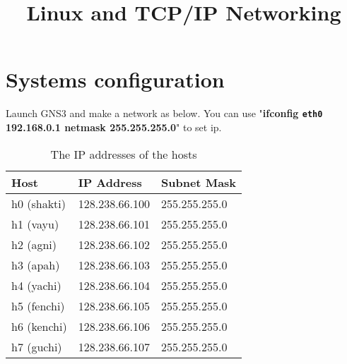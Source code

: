 \documentclass{../UTNetLab}
\title{Linux and TCP/IP Networking}
\author{%
    Dr. Ahmad Khonsari - \FR{دکتر احمد خونساری}\\
    \href{mailto:a_khonsari@ut.ac.ir}{a\_khonsari@ut.ac.ir}\\
    \vskip 1.5em%
    Amir Haji Ali Khamseh'i - \FR{امیر حاجی‌علی‌خمسه‌ء}\\
    \href{mailto:khamse@ut.ac.ir}{khamse@ut.ac.ir}\\
    \vskip 1.5em%
    \href{mailto:m.borhani@ut.ac.ir}{Muhammad Borhani} - \FR{محمد برهانی}\\
    \href{mailto:a.a.khordadi@ut.ac.ir}{Amirahmad Khordadi} - \FR{امیراحمد خردادی}\\
    \href{mailto:sina\_kashipazha@ut.ac.ir}{Sina Kashi pazha} - \FR{سینا کاشی‌پزها}
}
\begin{document}
    \maketitle

\section*{Systems configuration}
    Launch GNS3 and make a network as below. You can use "\textbf{ifconfig \texttt{eth0} 192.168.0.1 netmask 255.255.255.0}" to set ip.
    \begin{center}
        \begin{minipage}{0.48\textwidth}
            \begin{flushleft}
                \begin{table}[H]
                    \caption{The IP addresses of the hosts}
                    \vspace{5pt}
                    \centering
                    \begin{tabular}{ l l l }
                        \hline \hline
                        Host & IP Address & Subnet Mask \\
                        \hline 
                        h0 (shakti) & 128.238.66.100 & 255.255.255.0 \\
                        h1 (vayu) & 128.238.66.101 & 255.255.255.0 \\
                        h2 (agni) & 128.238.66.102 & 255.255.255.0 \\
                        h3 (apah) & 128.238.66.103 & 255.255.255.0 \\
                        h4 (yachi) & 128.238.66.104 & 255.255.255.0 \\
                        h5 (fenchi) & 128.238.66.105 & 255.255.255.0 \\
                        h6 (kenchi) & 128.238.66.106 & 255.255.255.0 \\
                        h7 (guchi) & 128.238.66.107 & 255.255.255.0 \\
                        \hline \hline
                        \end{tabular}
                \end{table}
            \end{flushleft}
        \end{minipage}
        \begin{minipage}{0.48\textwidth}

\end{minipage}
\end{center}
\end{document}
